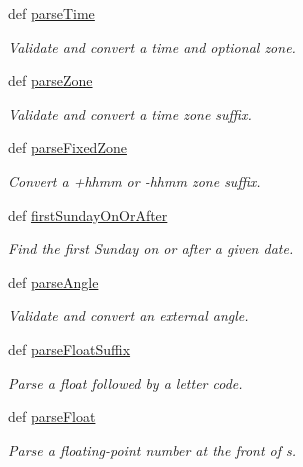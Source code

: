 \begin{DoxyCompactItemize}
def \hyperlink{namespaceamonpy_1_1sim_1_1sidereal_af3b82f3dee1b20b94cc81b98a5d0b63d}{parse\-Time}
\begin{DoxyCompactList}\small\item\em Validate and convert a time and optional zone. \end{DoxyCompactList}\item 
def \hyperlink{namespaceamonpy_1_1sim_1_1sidereal_a6eeb42277b679954122d251995342ec0}{parse\-Zone}
\begin{DoxyCompactList}\small\item\em Validate and convert a time zone suffix. \end{DoxyCompactList}\item 
def \hyperlink{namespaceamonpy_1_1sim_1_1sidereal_a8282330c49872b7637b932c4694bc4e0}{parse\-Fixed\-Zone}
\begin{DoxyCompactList}\small\item\em Convert a +hhmm or -\/hhmm zone suffix. \end{DoxyCompactList}\item 
def \hyperlink{namespaceamonpy_1_1sim_1_1sidereal_a6b8a7e31bdf2bfa7318540ffd6fc316b}{first\-Sunday\-On\-Or\-After}
\begin{DoxyCompactList}\small\item\em Find the first Sunday on or after a given date. \end{DoxyCompactList}\item 
def \hyperlink{namespaceamonpy_1_1sim_1_1sidereal_a50946002d41765a733b45bb1e023c287}{parse\-Angle}
\begin{DoxyCompactList}\small\item\em Validate and convert an external angle. \end{DoxyCompactList}\item 
def \hyperlink{namespaceamonpy_1_1sim_1_1sidereal_a9edb379c14fe6119a7ede7c36480e819}{parse\-Float\-Suffix}
\begin{DoxyCompactList}\small\item\em Parse a float followed by a letter code. \end{DoxyCompactList}\item 
def \hyperlink{namespaceamonpy_1_1sim_1_1sidereal_aeca4a919316574daa165a7d6dadef5d0}{parse\-Float}
\begin{DoxyCompactList}\small\item\em Parse a floating-\/point number at the front of s. \end{DoxyCompactList}\item 

\end{DoxyCompactItemize}
